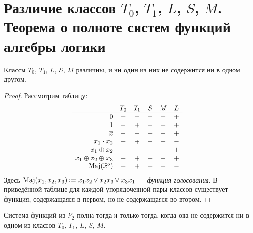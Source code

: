 \section{Различие классов $T_0$, $T_1$, $L$, $S$, $M$. Теорема о полноте систем функций алгебры логики}

\begin{theorem}
    Классы $T_0$, $T_1$, $L$, $S$, $M$ различны, и ни один из них не содержится ни в одном другом.
\end{theorem}

\begin{proof}
    Рассмотрим таблицу:
    \[
        \begin{array}{r | c c c c c}
            & T_0 & T_1 & S & M & L\\
            \hline
            0 & + & - & - & + & +\\
            1 & - & + & - & + & +\\
            \overline{x} & - & - & + & - & +\\
            x_1 \cdot x_2 & + & + & - & + & -\\
            x_1 \oplus x_2 & + & - & - & - & +\\
            x_1 \oplus x_2 \oplus x_3 & + & + & + & - & +\\
            \operatorname{Maj}(\widetilde{x}^3) & + & + & + & + & -\\
        \end{array}
    \]
    Здесь $\operatorname{Maj}(x_1, x_2, x_3) \vcentcolon = x_1x_2 \vee x_2x_3 \vee x_3x_1$ --- \textit{функция голосования}. В приведённой таблице для каждой упорядоченной пары классов существует функция, содержащаяся в первом, но не содержащаяся во втором.
\end{proof}

\begin{theorem}[Пост]
    Система функций из $P_2$ полна тогда и только тогда, когда она не содержится ни в одном из классов $T_0$, $T_1$, $L$, $S$, $M$.
\end{theorem}

